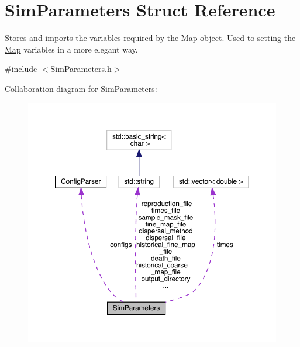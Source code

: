 \hypertarget{struct_sim_parameters}{}\section{Sim\+Parameters Struct Reference}
\label{struct_sim_parameters}


Stores and imports the variables required by the \hyperlink{class_map}{Map} object. Used to setting the \hyperlink{class_map}{Map} variables in a more elegant way.  




{\ttfamily \#include $<$Sim\+Parameters.\+h$>$}



Collaboration diagram for Sim\+Parameters\+:
\nopagebreak
\begin{figure}[H]
\begin{center}
\leavevmode
\includegraphics[width=350pt]{struct_sim_parameters__coll__graph}
\end{center}
\end{figure}
